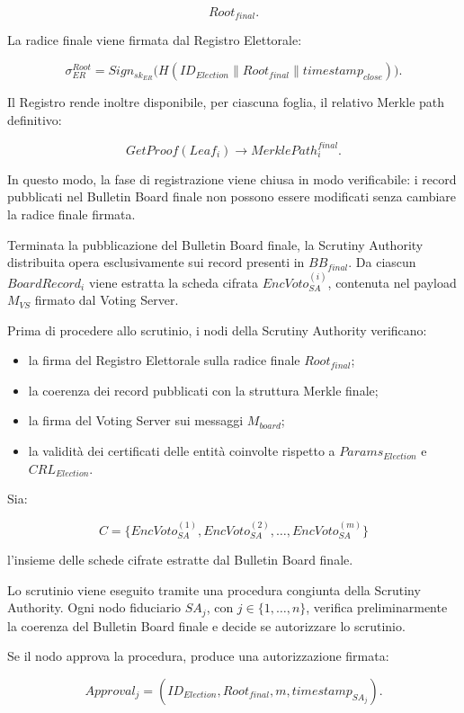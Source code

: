 \documentclass[a4paper,12pt]{article}
\begin{document}
\[
	Root_{final}.
\]

La radice finale viene firmata dal Registro Elettorale:

\[
	\sigma_{ER}^{Root} =
	Sign_{sk_{ER}}
	\big(
	H(ID_{Election} \parallel Root_{final} \parallel timestamp_{close})
	\big).
\]

Il Registro rende inoltre disponibile, per ciascuna foglia, il relativo Merkle path definitivo:

\[
	GetProof(Leaf_i) \rightarrow MerklePath_i^{final}.
\]

In questo modo, la fase di registrazione viene chiusa in modo verificabile: i record pubblicati nel Bulletin Board finale non possono essere modificati senza cambiare la radice finale firmata.

Terminata la pubblicazione del Bulletin Board finale, la Scrutiny Authority distribuita opera esclusivamente sui record presenti in \(BB_{final}\).
Da ciascun \(BoardRecord_i\) viene estratta la scheda cifrata \(EncVoto_{SA}^{(i)}\), contenuta nel payload \(M_{VS}\) firmato dal Voting Server.

Prima di procedere allo scrutinio, i nodi della Scrutiny Authority verificano:
\begin{itemize}
	\item la firma del Registro Elettorale sulla radice finale \(Root_{final}\);
	\item la coerenza dei record pubblicati con la struttura Merkle finale;
	\item la firma del Voting Server sui messaggi \(M_{board}\);
	\item la validit\`a dei certificati delle entit\`a coinvolte rispetto a \(Params_{Election}\) e \(CRL_{Election}\).
\end{itemize}

Sia:

\[
	C =
	\{EncVoto_{SA}^{(1)}, EncVoto_{SA}^{(2)}, \dots, EncVoto_{SA}^{(m)}\}
\]

l'insieme delle schede cifrate estratte dal Bulletin Board finale.

Lo scrutinio viene eseguito tramite una procedura congiunta della Scrutiny Authority.
Ogni nodo fiduciario \(SA_j\), con \(j \in \{1,\dots,n\}\), verifica preliminarmente la coerenza del Bulletin Board finale e decide se autorizzare lo scrutinio.

Se il nodo approva la procedura, produce una autorizzazione firmata:

\[
	Approval_j =
	(ID_{Election}, Root_{final}, m, timestamp_{SA_j}).
\]
\end{document}
